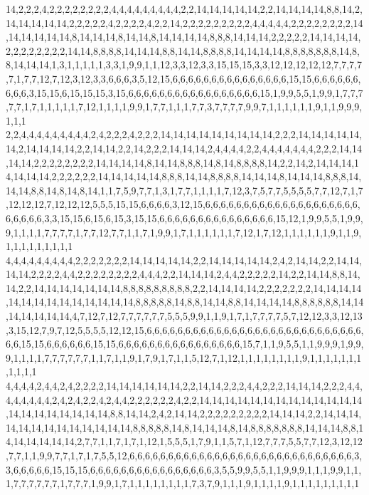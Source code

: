14,2,2,2,4,2,2,2,2,2,2,2,2,4,4,4,4,4,4,4,4,4,2,2,14,14,14,14,14,2,2,14,14,14,14,8,8,14,2,14,14,14,14,14,2,2,2,2,2,4,2,2,2,2,4,2,2,14,2,2,2,2,2,2,2,2,2,4,4,4,4,4,2,2,2,2,2,2,2,2,14,14,14,14,14,14,8,14,14,14,8,14,14,8,14,14,14,14,8,8,8,14,14,14,2,2,2,2,2,14,14,14,14,2,2,2,2,2,2,2,2,14,14,8,8,8,8,14,14,14,8,8,14,14,8,8,8,8,14,14,14,14,8,8,8,8,8,8,8,14,8,8,14,14,14,1,3,1,1,1,1,1,3,3,1,9,9,1,1,12,3,3,12,3,3,15,15,15,3,3,12,12,12,12,12,7,7,7,7,7,1,7,7,12,7,12,3,12,3,3,6,6,6,3,5,12,15,6,6,6,6,6,6,6,6,6,6,6,6,6,6,6,15,15,6,6,6,6,6,6,6,6,6,3,15,15,6,15,15,15,3,15,6,6,6,6,6,6,6,6,6,6,6,6,6,6,6,6,6,15,1,9,9,5,5,1,9,9,1,7,7,7,7,7,1,7,1,1,1,1,1,7,12,1,1,1,1,9,9,1,7,7,1,1,1,7,7,3,7,7,7,7,9,9,7,1,1,1,1,1,1,9,1,1,9,9,9,1,1,1
2,2,4,4,4,4,4,4,4,4,4,2,4,2,2,2,4,2,2,2,14,14,14,14,14,14,14,14,14,2,2,2,14,14,14,14,14,14,2,14,14,14,14,2,2,14,14,2,2,14,2,2,2,14,14,14,2,4,4,4,4,2,2,4,4,4,4,4,4,4,2,2,2,14,14,14,14,2,2,2,2,2,2,2,2,14,14,14,14,8,14,14,8,8,8,14,8,14,8,8,8,8,14,2,2,14,2,14,14,14,14,14,14,14,2,2,2,2,2,2,14,14,14,14,14,8,8,8,14,14,8,8,8,8,14,14,14,8,14,14,14,8,8,8,14,14,14,8,8,14,8,14,8,14,1,1,7,5,9,7,7,1,3,1,7,7,1,1,1,1,7,12,3,7,5,7,7,5,5,5,5,7,7,12,7,1,7,12,12,12,7,12,12,12,5,5,5,15,15,6,6,6,6,3,12,15,6,6,6,6,6,6,6,6,6,6,6,6,6,6,6,6,6,6,6,6,6,6,6,6,6,3,3,15,15,6,15,6,15,3,15,15,6,6,6,6,6,6,6,6,6,6,6,6,6,6,6,15,12,1,9,9,5,5,1,9,9,9,1,1,1,1,7,7,7,7,1,7,7,12,7,7,1,1,7,1,9,9,1,7,1,1,1,1,1,1,7,12,1,7,12,1,1,1,1,1,1,9,1,1,9,1,1,1,1,1,1,1,1,1
4,4,4,4,4,4,4,4,4,2,2,2,2,2,2,2,14,14,14,14,14,2,2,14,14,14,14,14,2,4,2,14,14,2,2,14,14,14,14,2,2,2,2,4,4,2,2,2,2,2,2,2,2,4,4,4,2,2,14,14,14,2,4,4,2,2,2,2,2,14,2,2,14,14,8,8,14,14,2,2,14,14,14,14,14,14,14,8,8,8,8,8,8,8,8,8,2,2,14,14,14,14,2,2,2,2,2,2,2,14,14,14,14,14,14,14,14,14,14,14,14,14,14,8,8,8,8,8,14,8,8,14,14,8,8,14,14,14,14,8,8,8,8,8,8,14,14,14,14,14,14,14,4,7,12,7,12,7,7,7,7,7,7,5,5,5,9,9,1,1,9,1,7,1,7,7,7,7,5,7,12,12,3,3,12,13,3,15,12,7,9,7,12,5,5,5,5,12,12,15,6,6,6,6,6,6,6,6,6,6,6,6,6,6,6,6,6,6,6,6,6,6,6,6,6,6,6,6,6,6,15,15,6,6,6,6,6,6,15,15,6,6,6,6,6,6,6,6,6,6,6,6,6,6,6,6,15,7,1,1,9,5,5,1,1,9,9,9,1,9,9,9,1,1,1,1,7,7,7,7,7,7,1,1,7,1,1,9,1,7,9,1,7,1,1,5,12,7,1,12,1,1,1,1,1,1,1,1,9,1,1,1,1,1,1,1,1,1,1,1
4,4,4,4,2,4,4,2,4,2,2,2,2,14,14,14,14,14,14,2,2,14,14,2,2,2,4,4,2,2,2,14,14,14,2,2,2,4,4,4,4,4,4,4,4,2,4,2,4,2,2,4,2,4,4,2,2,2,2,2,2,4,2,2,14,14,14,14,14,14,14,14,14,14,14,14,14,14,14,14,14,14,14,14,14,8,8,14,14,2,4,2,14,14,2,2,2,2,2,2,2,2,2,14,14,14,2,2,14,14,14,14,14,14,14,14,14,14,14,14,14,8,8,8,8,8,14,8,14,14,14,8,14,8,8,8,8,8,8,8,14,14,14,8,8,14,14,14,14,14,14,2,7,7,1,1,7,1,7,1,12,1,5,5,5,1,7,9,1,1,5,7,1,12,7,7,7,5,5,7,7,12,3,12,12,7,7,1,1,9,9,7,7,1,7,1,7,5,5,12,6,6,6,6,6,6,6,6,6,6,6,6,6,6,6,6,6,6,6,6,6,6,6,6,6,6,6,6,6,3,3,6,6,6,6,6,15,15,15,6,6,6,6,6,6,6,6,6,6,6,6,6,6,6,6,3,5,5,9,9,5,5,1,1,9,9,9,1,1,1,9,9,1,1,1,7,7,7,7,7,7,1,7,7,7,1,9,9,1,7,1,1,1,1,1,1,1,1,7,3,7,9,1,1,1,9,1,1,1,1,9,1,1,1,1,1,1,1,1,1
